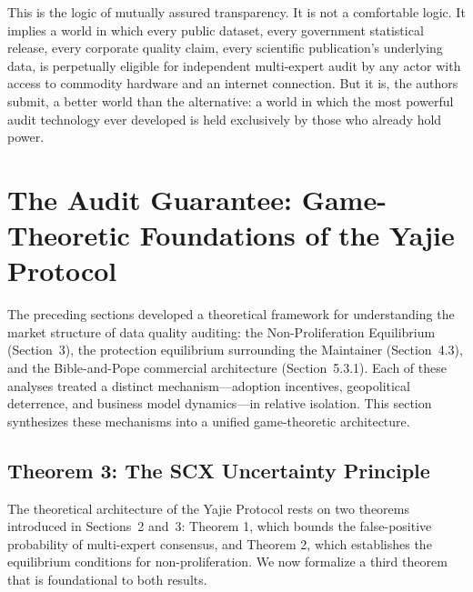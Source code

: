 \documentclass[12pt,a4paper]{article}
\theoremstyle{definition}
\theoremstyle{remark}
\begin{document}
This is the logic of mutually assured transparency. It is not a comfortable logic. It implies a world in which every public dataset, every government statistical release, every corporate quality claim, every scientific publication's underlying data, is perpetually eligible for independent multi-expert audit by any actor with access to commodity hardware and an internet connection. But it is, the authors submit, a better world than the alternative: a world in which the most powerful audit technology ever developed is held exclusively by those who already hold power.

\section{The Audit Guarantee: Game-Theoretic Foundations of the Yajie Protocol}

The preceding sections developed a theoretical framework for understanding the market structure of data quality auditing: the Non-Proliferation Equilibrium (Section~3), the protection equilibrium surrounding the Maintainer (Section~4.3), and the Bible-and-Pope commercial architecture (Section~5.3.1). Each of these analyses treated a distinct mechanism—adoption incentives, geopolitical deterrence, and business model dynamics—in relative isolation. This section synthesizes these mechanisms into a unified game-theoretic architecture.

\subsection{Theorem 3: The SCX Uncertainty Principle}

The theoretical architecture of the Yajie Protocol rests on two theorems introduced in Sections~2 and~3: Theorem 1, which bounds the false-positive probability of multi-expert consensus, and Theorem 2, which establishes the equilibrium conditions for non-proliferation. We now formalize a third theorem that is foundational to both results.
\end{document}
